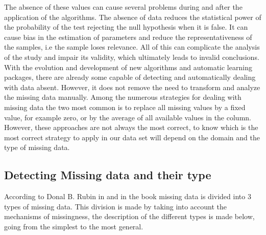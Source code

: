 The absence of these values can cause several problems during and after the application of the algorithms. The absence of data reduces the statistical power of the probability of the test rejecting the null hypothesis when it is false. It can cause bias in the estimation of parameters and reduce the representativeness of the samples, i.e the sample loses relevance. All of this can complicate the analysis of the study and impair its validity, which ultimately leads to invalid conclusions.\cite{Hang} With the evolution and development of new algorithms and automatic learning packages, there are already some capable of detecting and automatically dealing with data absent. However, it does not remove the need to transform and analyze the missing data manually. Among the numerous strategies for dealing with missing data the two most common is to replace all missing values by a fixed value, for example zero, or by the average of all available values in the column. However, these approaches are not always the most correct, to know which is the most correct strategy to apply in our data set will depend on the domain and the type of missing data.


\subsection{Detecting Missing data and their type} %
\label{sec:document_structure}
\hspace{10px}According to Donal B. Rubin in \cite{Rubin} and in the book \cite{Berthold} missing data is divided into 3 types of missing data. This division is made by taking into account the mechanisms of missingness, the description of the different types is made below, going from the simplest to the most general.

